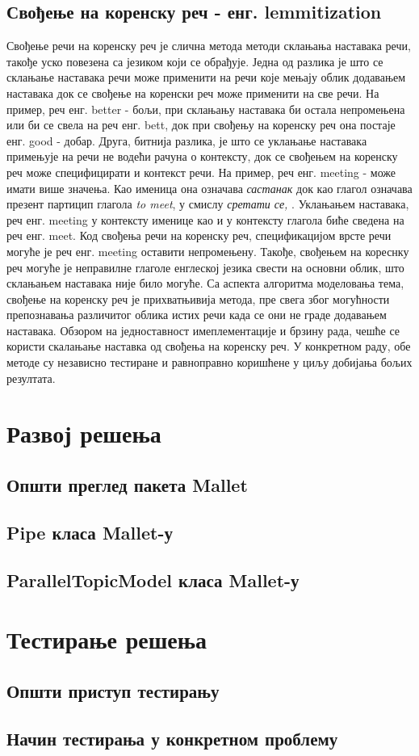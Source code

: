 	
	\subsection{Свођење на коренску реч - енг. lemmitization}

Свођење речи на коренску реч је слична метода методи склањања наставака речи, такође уско повезена са језиком који се обрађује. Једна од  разлика је што се склањање наставака речи може применити на речи које мењају облик додавањем наставака док се свођење на коренски реч може применити на све речи. На пример,  реч енг. better - бољи, при склањању наставака би остала непромењена  или би се свела на реч енг. bett,  док при свођењу на коренску реч она постаје енг. good - добар.
Друга, битнија разлика, је што се уклањање наставака  примењује на речи не водећи рачуна о контексту, док се свођењем на коренску реч може специфицирати и контекст речи. На пример, реч енг. meeting - може имати више значења. Као именица она означава \textit{састанак} док као глагол означава презент партицип глагола \textit{to meet}, у смислу \textit{сретати се, }. Уклањањем наставака, реч енг. meeting  у контексту именице као и у контексту глагола биће сведена на реч енг. meet. Код свођења речи на коренску реч, спецификацијом врсте речи могуће је реч енг. meeting оставити непромењену.
Такође, свођењем на кореснку реч могуће је неправилне глаголе енглеској језика свести на основни облик, што склањањем наставака није било могуће. 
Са аспекта алгоритма моделовања тема, свођење на коренску реч је прихватњивија метода, пре свега због могућности препознавања различитог облика истих речи када се они не граде додавањем наставака.
Обзором на једноставност имеплементације и брзину рада, чешће се користи скалањање наставка од свођења на коренску реч. У конкретном раду, обе методе су независно тестиране и равноправно коришћене у циљу добијања бољих резултата.
	
\section{Развој решења}

\subsection{Општи преглед пакета Mallet}
\subsection{Pipe класа Mallet-у}
\subsection{ParallelTopicModel класа Mallet-у}


\section{Тестирање решења}

\subsection{Општи приступ тестирању }
\subsection{Начин тестирања у конкретном проблему }